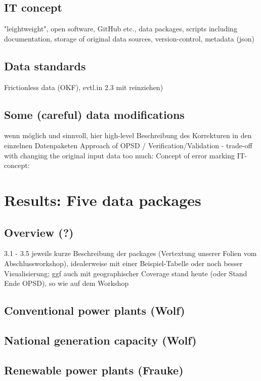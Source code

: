 \documentclass[article]{elsarticle}
\begin{document}
\subsection{IT concept}
"leightweight", open software, GitHub etc., data packages, scripts including documentation, storage of original data sources, version-control, metadata (json)

\subsection{Data standards}
Frictionless data (OKF), evtl.in 2.3 mit reinziehen)

\subsection{Some (careful) data modifications}
wenn möglich und sinnvoll, hier high-level Beschreibung des Korrekturen in den einzelnen Datenpaketen Approach of OPSD / Verification/Validation - trade-off with changing the original input data too much: Concept of error marking IT-concept: 

\section{Results: Five data packages}
\subsection{Overview (?)}
3.1 - 3.5 jeweils kurze Beschreibung der packages (Vertextung unserer Folien vom Abschlussworkshop), idealerweise mit einer Beispiel-Tabelle oder noch besser Visualisierung; ggf auch mit geographischer Coverage stand heute (oder Stand Ende OPSD), so wie auf dem Workshop 
\subsection{Conventional power plants (Wolf)}
\subsection{National generation capacity (Wolf)}
\subsection{Renewable power plants (Frauke)}
\end{document}
